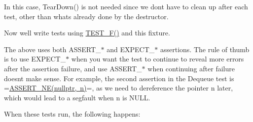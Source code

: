 In this case, {\ttfamily Tear\+Down()} is not needed since we don\textquotesingle{}t have to clean up after each test, other than what\textquotesingle{}s already done by the destructor.

Now we\textquotesingle{}ll write tests using {\ttfamily \mbox{\hyperlink{gtest_8h_a0ee66d464d1a06c20c1929cae09d8758}{T\+E\+S\+T\+\_\+\+F()}}} and this fixture.


\begin{DoxyCode}{0}
\DoxyCodeLine{\}}
\DoxyCodeLine{}
\DoxyCodeLine{}
\DoxyCodeLine{}
\DoxyCodeLine{\}}
\end{DoxyCode}


The above uses both {\ttfamily A\+S\+S\+E\+R\+T\+\_\+$\ast$} and {\ttfamily E\+X\+P\+E\+C\+T\+\_\+$\ast$} assertions. The rule of thumb is to use {\ttfamily E\+X\+P\+E\+C\+T\+\_\+$\ast$} when you want the test to continue to reveal more errors after the assertion failure, and use {\ttfamily A\+S\+S\+E\+R\+T\+\_\+$\ast$} when continuing after failure doesn\textquotesingle{}t make sense. For example, the second assertion in the {\ttfamily Dequeue} test is =\mbox{\hyperlink{gtest_8h_aa866c8dece57912e6f51495ed3e8d8d5}{A\+S\+S\+E\+R\+T\+\_\+\+N\+E(nullptr, n)}}=, as we need to dereference the pointer {\ttfamily n} later, which would lead to a segfault when {\ttfamily n} is {\ttfamily N\+U\+LL}.

When these tests run, the following happens\+:


